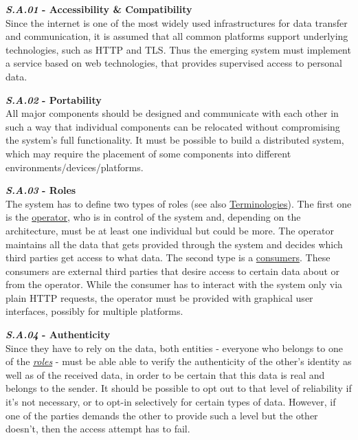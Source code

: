 \documentclass[12pt,english,a4paper,titlepage,cleardoublepage=empty,dottedtoc]{report}
\begin{document}
\textbf{\emph{\protect\hypertarget{sa01}{}{S.A.01}} - Accessibility \&
Compatibility}\\
Since the internet is one of the most widely used infrastructures for
data transfer and communication, it is assumed that all common platforms
support underlying technologies, such as HTTP and TLS. Thus the emerging
system must implement a service based on web technologies, that provides
supervised access to personal data.

\textbf{\emph{\protect\hypertarget{sa02}{}{S.A.02}} - Portability}\\
All major components should be designed and communicate with each other
in such a way that individual components can be relocated without
compromising the system's full functionality. It must be possible to
build a distributed system, which may require the placement of some
components into different environments/devices/platforms.

\textbf{\emph{\protect\hypertarget{sa03}{}{S.A.03}} - Roles}\\
The system has to define two types of roles (see also
\protect\hyperlink{terminologies}{Terminologies}). The first one is the
\protect\hyperlink{terminologies--operator}{operator}, who is in control
of the system and, depending on the architecture, must be at least one
individual but could be more. The operator maintains all the data that
gets provided through the system and decides which third parties get
access to what data. The second type is a
\protect\hyperlink{terminologies--consumer}{consumers}. These consumers
are external third parties that desire access to certain data about or
from the operator. While the consumer has to interact with the system
only via plain HTTP requests, the operator must be provided with
graphical user interfaces, possibly for multiple platforms.

\textbf{\emph{\protect\hypertarget{sa04}{}{S.A.04}} - Authenticity}\\
Since they have to rely on the data, both entities - everyone who
belongs to one of the \emph{\protect\hyperlink{sa03}{roles}} - must be
able able to verify the authenticity of the other's identity as well as
of the received data, in order to be certain that this data is real and
belongs to the sender. It should be possible to opt out to that level of
reliability if it's not necessary, or to opt-in selectively for certain
types of data. However, if one of the parties demands the other to
provide such a level but the other doesn't, then the access attempt has
to fail.
\end{document}
